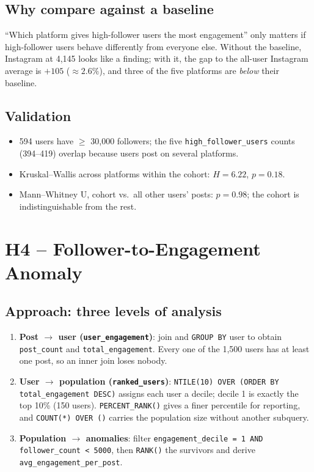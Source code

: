\documentclass[11pt,a4paper]{article}
\begin{document}
\subsection{Why compare against a baseline}
``Which platform gives high-follower users the most engagement'' only matters if high-follower users behave differently from everyone else. Without the baseline, Instagram at 4,145 looks like a finding; with it, the gap to the all-user Instagram average is $+105$ ($\approx 2.6\%$), and three of the five platforms are \emph{below} their baseline.

\subsection{Validation}
\begin{itemize}[leftmargin=*]
  \item 594 users have $\geq$ 30,000 followers; the five \texttt{high\_follower\_users} counts (394--419) overlap because users post on several platforms.
  \item Kruskal--Wallis across platforms within the cohort: $H = 6.22$, $p = 0.18$.
  \item Mann--Whitney U, cohort vs.\ all other users' posts: $p = 0.98$; the cohort is indistinguishable from the rest.
\end{itemize}

\section{H4 -- Follower-to-Engagement Anomaly}

\subsection{Approach: three levels of analysis}
\begin{enumerate}[leftmargin=*]
  \item \textbf{Post $\rightarrow$ user (\texttt{user\_engagement})}: join and \texttt{GROUP BY} user to obtain \texttt{post\_count} and \texttt{total\_engagement}. Every one of the 1,500 users has at least one post, so an inner join loses nobody.
  \item \textbf{User $\rightarrow$ population (\texttt{ranked\_users})}: \texttt{NTILE(10) OVER (ORDER BY total\_engagement DESC)} assigns each user a decile; decile 1 is exactly the top 10\% (150 users). \texttt{PERCENT\_RANK()} gives a finer percentile for reporting, and \texttt{COUNT(*) OVER ()} carries the population size without another subquery.
  \item \textbf{Population $\rightarrow$ anomalies}: filter \texttt{engagement\_decile = 1 AND follower\_count < 5000}, then \texttt{RANK()} the survivors and derive \texttt{avg\_engagement\_per\_post}.
\end{enumerate}
\end{document}
